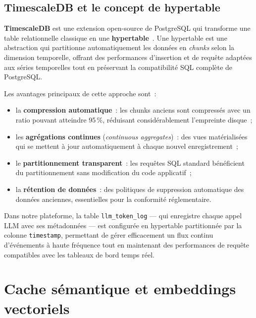 \subsection{TimescaleDB et le concept de hypertable}

\textbf{TimescaleDB} est une extension open-source de PostgreSQL qui transforme une table relationnelle classique en une \textbf{hypertable}~\cite{timescaledb2024}. Une hypertable est une abstraction qui partitionne automatiquement les données en \textit{chunks} selon la dimension temporelle, offrant des performances d'insertion et de requête adaptées aux séries temporelles tout en préservant la compatibilité SQL complète de PostgreSQL.

Les avantages principaux de cette approche sont~:

\begin{itemize}[noitemsep]
    \item la \textbf{compression automatique}~: les chunks anciens sont compressés avec un ratio pouvant atteindre 95\,\%, réduisant considérablement l'empreinte disque~;
    \item les \textbf{agrégations continues} (\textit{continuous aggregates})~: des vues matérialisées qui se mettent à jour automatiquement à chaque nouvel enregistrement~;
    \item le \textbf{partitionnement transparent}~: les requêtes SQL standard bénéficient du partitionnement sans modification du code applicatif~;
    \item la \textbf{rétention de données}~: des politiques de suppression automatique des données anciennes, essentielles pour la conformité réglementaire.
\end{itemize}

Dans notre plateforme, la table \texttt{llm\_token\_log} --- qui enregistre chaque appel LLM avec ses métadonnées --- est configurée en hypertable partitionnée par la colonne \texttt{timestamp}, permettant de gérer efficacement un flux continu d'événements à haute fréquence tout en maintenant des performances de requête compatibles avec les tableaux de bord temps réel.


\section{Cache sémantique et embeddings vectoriels}
\label{sec:embeddings}

